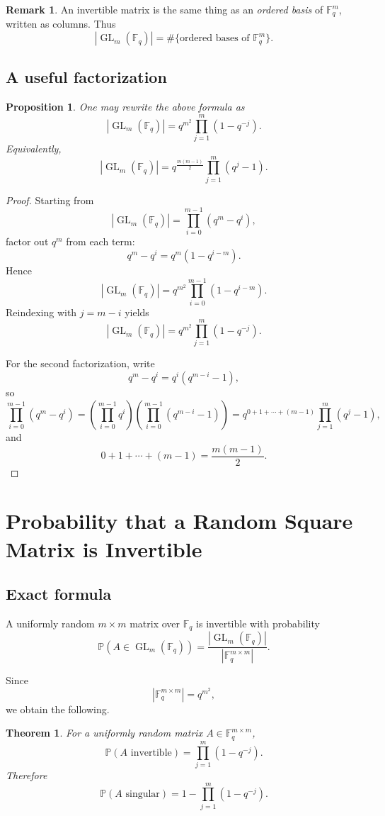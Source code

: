 \documentclass[11pt]{article}
\newcommand{\F}{\mathbb{F}}
\newcommand{\GL}{\operatorname{GL}}
\newcommand{\Prob}{\mathbb{P}}
\theoremstyle{definition}
\newtheorem{remark}[definition]{Remark}
\theoremstyle{plain}
\newtheorem{proposition}[definition]{Proposition}
\newtheorem{theorem}[definition]{Theorem}
\begin{document}
	\begin{remark}
		An invertible matrix is the same thing as an \emph{ordered basis} of \(\F_q^m\), written as columns. Thus
		\[
		|\GL_m(\F_q)| = \#\{\text{ordered bases of }\F_q^m\}.
		\]
	\end{remark}
	
	\subsection{A useful factorization}
	
	\begin{proposition}
		One may rewrite the above formula as
		\[
		|\GL_m(\F_q)| = q^{m^2}\prod_{j=1}^m (1-q^{-j}).
		\]
		Equivalently,
		\[
		|\GL_m(\F_q)| = q^{\frac{m(m-1)}{2}} \prod_{j=1}^m (q^j-1).
		\]
	\end{proposition}
	
	\begin{proof}
		Starting from
		\[
		|\GL_m(\F_q)|=\prod_{i=0}^{m-1}(q^m-q^i),
		\]
		factor out \(q^m\) from each term:
		\[
		q^m-q^i = q^m(1-q^{i-m}).
		\]
		Hence
		\[
		|\GL_m(\F_q)| = q^{m^2}\prod_{i=0}^{m-1}(1-q^{i-m}).
		\]
		Reindexing with \(j=m-i\) yields
		\[
		|\GL_m(\F_q)| = q^{m^2}\prod_{j=1}^{m}(1-q^{-j}).
		\]
		
		For the second factorization, write
		\[
		q^m-q^i = q^i(q^{m-i}-1),
		\]
		so
		\[
		\prod_{i=0}^{m-1}(q^m-q^i)
		=
		\left(\prod_{i=0}^{m-1} q^i\right)\left(\prod_{i=0}^{m-1}(q^{m-i}-1)\right)
		=
		q^{0+1+\cdots+(m-1)}\prod_{j=1}^{m}(q^j-1),
		\]
		and
		\[
		0+1+\cdots+(m-1)=\frac{m(m-1)}2.
		\]
	\end{proof}
	
	\section{Probability that a Random Square Matrix is Invertible}
	
	\subsection{Exact formula}
	
	A uniformly random \(m\times m\) matrix over \(\F_q\) is invertible with probability
	\[
	\Prob(A\in \GL_m(\F_q))=\frac{|\GL_m(\F_q)|}{|\F_q^{m\times m}|}.
	\]
	
	Since
	\[
	|\F_q^{m\times m}|=q^{m^2},
	\]
	we obtain the following.
	
	\begin{theorem}
		For a uniformly random matrix \(A\in \F_q^{m\times m}\),
		\[
		\Prob(A \text{ invertible}) = \prod_{j=1}^{m}(1-q^{-j}).
		\]
		Therefore
		\[
		\Prob(A \text{ singular}) = 1-\prod_{j=1}^{m}(1-q^{-j}).
		\]
	\end{theorem}
	
\end{document}
